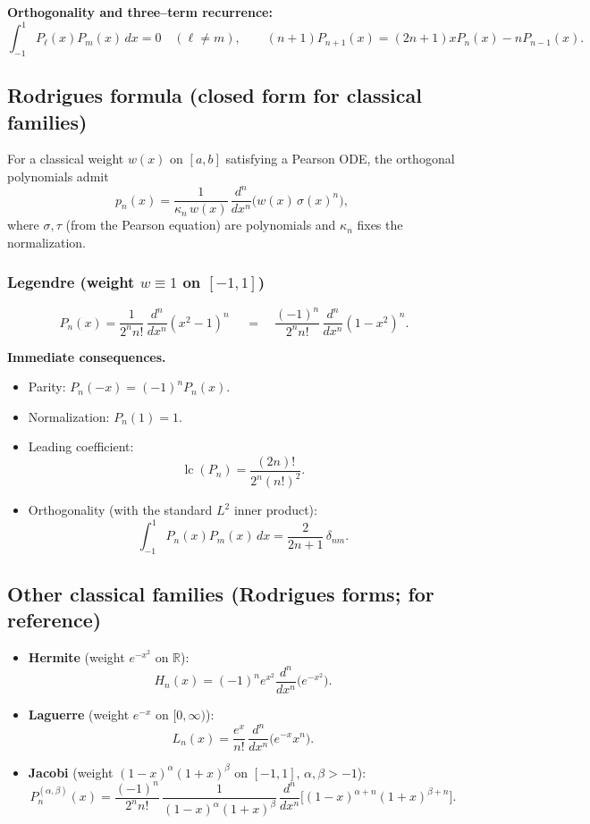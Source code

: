 \documentclass[12pt,a4paper]{article}
\theoremstyle{plain}
\theoremstyle{definition}
\theoremstyle{remark}
\theoremstyle{remark}
\begin{document}
\smallskip
\noindent\textbf{Orthogonality and three–term recurrence:}
\[
\int_{-1}^{1} P_\ell(x)P_m(x)\,dx=0\quad(\ell\ne m),\qquad
(n+1)P_{n+1}(x)=(2n+1)xP_n(x)-nP_{n-1}(x).
\]

\subsection*{Rodrigues formula (closed form for classical families)}
For a classical weight $w(x)$ on $[a,b]$ satisfying a Pearson ODE, the orthogonal
polynomials admit
\[
p_n(x)=\frac{1}{\kappa_n\,w(x)}\,\frac{d^n}{dx^n}\!\Big( w(x)\,\sigma(x)^n\Big),
\]
where $\sigma,\tau$ (from the Pearson equation) are polynomials and $\kappa_n$ fixes the normalization.

\subsubsection*{Legendre (weight $w\equiv 1$ on $[-1,1]$)}
\[
\boxed{\;P_n(x)=\frac{1}{2^n n!}\,\frac{d^n}{dx^n}\left(x^2-1\right)^{\!n}\;}
\quad=\quad
\frac{(-1)^n}{2^n n!}\,\frac{d^n}{dx^n}\left(1-x^2\right)^{\!n}.
\]

\smallskip
\noindent\textbf{Immediate consequences.}
\begin{itemize}\setlength{\itemsep}{0.4em}
	\item Parity: $P_n(-x)=(-1)^n P_n(x)$.
	\item Normalization: $P_n(1)=1$.
	\item Leading coefficient:
	\[
	\operatorname{lc}(P_n)=\frac{(2n)!}{2^n (n!)^2}.
	\]
	\item Orthogonality (with the standard $L^2$ inner product):
	\[
	\int_{-1}^{1} P_n(x)P_m(x)\,dx
	=\frac{2}{2n+1}\,\delta_{nm}.
	\]
\end{itemize}

\subsection*{Other classical families (Rodrigues forms; for reference)}
\begin{itemize}\setlength{\itemsep}{0.35em}
	\item \textbf{Hermite} (weight $e^{-x^2}$ on $\mathbb R$):
	\[
	H_n(x)=( -1)^n e^{x^2}\frac{d^n}{dx^n}\big(e^{-x^2}\big).
	\]
	\item \textbf{Laguerre} (weight $e^{-x}$ on $[0,\infty)$):
	\[
	L_n(x)=\frac{e^{x}}{n!}\,\frac{d^n}{dx^n}\big(e^{-x} x^{n}\big).
	\]
	\item \textbf{Jacobi} (weight $(1-x)^\alpha(1+x)^\beta$ on $[-1,1]$, $\alpha,\beta>-1$):
	\[
	P_n^{(\alpha,\beta)}(x)
	=\frac{(-1)^n}{2^n n!}\,\frac{1}{(1-x)^\alpha(1+x)^\beta}\,
	\frac{d^n}{dx^n}\!\Big[(1-x)^{\alpha+n}(1+x)^{\beta+n}\Big].
	\]
\end{itemize}
\end{document}
